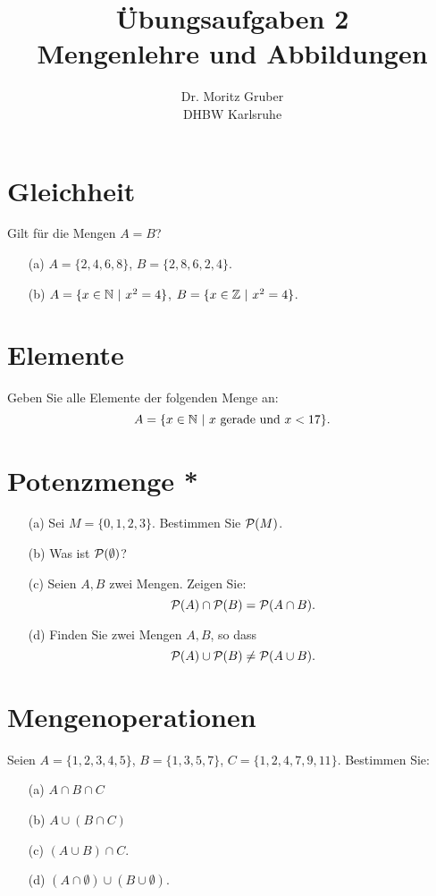\documentclass[
				a4paper,
				10pt
			]
			{scrartcl}
\author{Dr. Moritz Gruber\\ DHBW Karlsruhe}
\title{\"Ubungsaufgaben 2\\ 
	Mengenlehre und Abbildungen
}
\date{}
\begin{document}
\maketitle


\section{Gleichheit}
Gilt f\"ur die Mengen $A=B$?
\begin{itemize}
	\item[(a)] $A = \{2,4,6,8\}$, $B = \{2,8,6,2,4\}$.
	\item[(b)] $A = \{ x \in \mathbb{N} ~|~ x^2 = 4\}$, $B = \{ x\in \mathbb{Z} ~|~ x^2 = 4\}$.
\end{itemize}

\section{Elemente}
Geben Sie alle Elemente der folgenden Menge an:
$$
	A = \{ x \in \mathbb{N} ~|~ x \text{~gerade und~} x < 17\}.
$$

\section{Potenzmenge *}

\begin{itemize}
	\item[(a)]Sei $M = \{0,1,2,3\}.$ Bestimmen Sie ${\cal P}(M)$.
	\item[(b)] Was ist ${\cal P}(\emptyset)$?
	\item[(c)] Seien $A, B$ zwei Mengen. Zeigen Sie:
			$$
				{\cal P}(A) \cap {\cal P}(B) = {\cal P}(A\cap B).
			$$
	\item[(d)] Finden Sie zwei Mengen $A,B$, so dass
			$$
				{\cal P}(A) \cup {\cal P}(B) \neq {\cal P}(A\cup B).
			$$
\end{itemize}

\section{Mengenoperationen}

Seien $A = \{1,2,3,4,5 \}$, $B=\{1,3,5,7\}$, $C= \{ 1,2,4,7,9,11\}$. Bestimmen Sie:
\begin{itemize}
	\item[(a)] $A\cap B \cap C$
	\item[(b)] $A\cup( B\cap C)$
	\item[(c)] $(A\cup B) \cap C$.
	\item[(d)] $(A\cap \emptyset) \cup (B \cup \emptyset)$.
\end{itemize}
\end{document}

